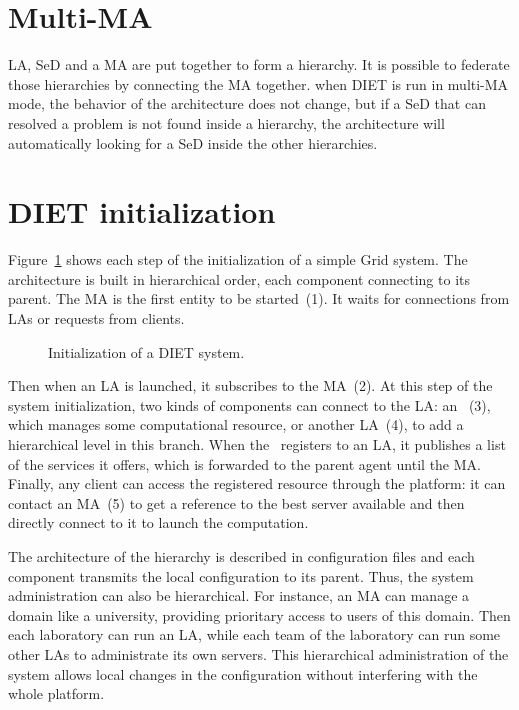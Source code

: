 \section{Multi-MA}
\label{init:multima}

LA, SeD and a MA are put together to form a hierarchy. It is possible
to federate those hierarchies by connecting the MA together. when DIET
is run in multi-MA mode, the behavior of the architecture does not
change, but if a SeD that can resolved a problem is not found inside a
hierarchy, the architecture will automatically looking for a SeD
inside the other hierarchies.

\section{DIET initialization}
\label{init}

Figure~\ref{fig:init} shows each step of the initialization of a
simple Grid system. The architecture is built in hierarchical order,
each component connecting to its parent. The MA is the first entity to
be started~(1). It waits for connections from LAs or requests from
clients.

\begin{figure}[hbt]
  \begin{center}
    \caption{Initialization of a DIET system.}
    \label{fig:init}
  \end{center}
\end{figure}

Then when an LA is launched, it subscribes to the MA~(2). At this step
of the system initialization, two kinds of components can connect to
the LA: an \sed ~(3), which manages some computational resource, or
another LA~(4), to add a hierarchical level in this branch. When the
\sed\ registers to an LA, it publishes a list of the services it
offers, which is forwarded to the parent agent until the MA.  Finally,
any client can access the registered resource through the platform: it
can contact an MA~(5) to get a reference to the best server available
and then directly connect to it to launch the computation.

The architecture of the hierarchy is described in configuration files
and each component transmits the local configuration to its
parent. Thus, the system administration can also be hierarchical. For
instance, an MA can manage a domain like a university, providing
prioritary access to users of this domain. Then each laboratory can
run an LA, while each team of the laboratory can run some other LAs to
administrate its own servers. This hierarchical administration of the
system allows local changes in the configuration without interfering
with the whole platform.



